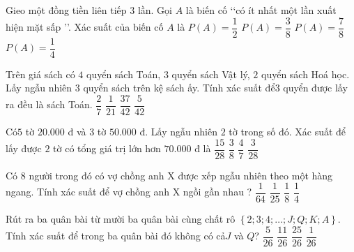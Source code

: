 \begin{ex}
Gieo một đồng tiền liên tiếp $3$ lần. Gọi $A$ là biến cố \lq\lq  có ít nhất một lần xuất hiện mặt sấp \rq\rq . Xác suất của biến cố $A$ là
\choice
{$P(A)=\dfrac{1}{2}$}
{$P(A)=\dfrac{3}{8}$}
{\True $P(A)=\dfrac{7}{8}$}
{$P(A)=\dfrac{1}{4}$}
\end{ex}
\begin{ex}
Trên giá sách có $4$ quyển sách Toán, $3$ quyển sách Vật lý, $2$ quyển sách Hoá học. Lấy ngẫu nhiên $3$ quyển sách trên kệ sách ấy. Tính xác suất để$3$ quyển được lấy ra đều là sách Toán.
\choice
{$\dfrac{2}{7}$}
{\True $\dfrac{1}{21}$}
{$\dfrac{37}{42}$}
{$\dfrac{5}{42}$}
\end{ex}
\begin{ex}
Có$5$ tờ $20.000$ đ và 3 tờ $50.000$ đ. Lấy ngẫu nhiên $2$ tờ trong số đó. Xác suất để lấy được $2$ tờ có tổng giá trị lớn hơn $70.000$ đ là
\choice
{$\dfrac{15}{28}$}
{$\dfrac{3}{8}$}
{$\dfrac{4}{7}$}
{\True $\dfrac{3}{28}$}
\end{ex}
\begin{ex}
Có $8$ người trong đó có vợ chồng anh X được xếp ngẫu nhiên theo một hàng ngang. Tính xác suất để vợ chồng anh X ngồi gần nhau ?
\choice
{$\dfrac{1}{64}$}
{$\dfrac{1}{25}$}
{$\dfrac{1}{8}$}
{\True $\dfrac{1}{4}$}
\end{ex}
\begin{ex}
Rút ra ba quân bài từ mười ba quân bài cùng chất rô $\left\{ 2;3;4;\ldots ;J;Q;K;A \right\}$. Tính xác suất để trong ba quân bài đó không có cả$J$ và $Q$?
\choice
{$\dfrac{5}{26}$}
{$\dfrac{11}{26}$}
{\True $\dfrac{25}{26}$}
{$\dfrac{1}{26}$}
\end{ex}
